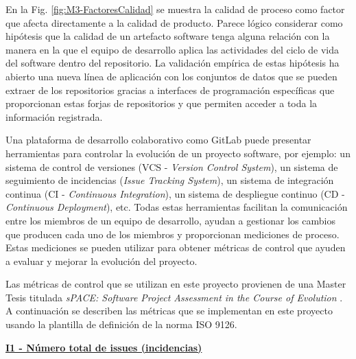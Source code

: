 En la Fig. \ref{fig:M3-FactoresCalidad} se muestra la calidad de proceso como factor que afecta directamente a la calidad de producto. Parece lógico considerar como hipótesis que la calidad de un artefacto software tenga alguna relación con la manera en la que el equipo de desarrollo aplica las actividades del ciclo de vida del software dentro del repositorio. La validación empírica de estas  hipótesis ha abierto una nueva línea de aplicación con los conjuntos de datos que se pueden extraer de los repositorios gracias a interfaces de programación específicas que proporcionan estas forjas de repositorios y que permiten acceder a toda la información registrada.

Una plataforma de desarrollo colaborativo como GitLab puede presentar herramientas para controlar la evolución de un proyecto software, por ejemplo: un sistema de control de versiones (VCS - \textit{Version Control System}), un sistema de seguimiento de incidencias (\textit{Issue Tracking System}), un sistema de integración continua (CI - \textit{Continuous Integration}), un sistema de despliegue continuo (CD - \textit{Continuous Deployment}), etc.
Todas estas herramientas facilitan la comunicación entre los miembros de un equipo de desarrollo, ayudan a gestionar los cambios que producen cada uno de los miembros y proporcionan mediciones de proceso. Estas mediciones se pueden utilizar para obtener métricas de control que ayuden a evaluar y mejorar la evolución del proyecto.

Las métricas de control que se utilizan en este proyecto provienen de una Master Tesis titulada \textit{sPACE: Software Project Assessment in the Course of Evolution} \cite{ratzinger_space:_2007}. 
A continuación se describen las métricas que se implementan en este proyecto usando la plantilla de definición de la norma ISO 9126.

 
\textbf{\underline{I1 - Número total de issues (incidencias)}}

